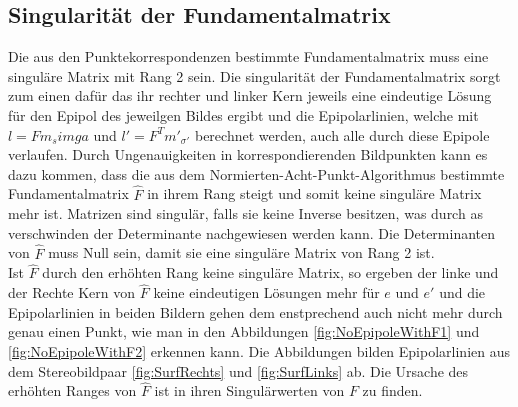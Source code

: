 \subsection{Singularität der Fundamentalmatrix}
\label{sec:SingularityOfF}

Die aus den Punktekorrespondenzen bestimmte Fundamentalmatrix muss eine singuläre Matrix mit Rang 2 sein\cite{HZ,ZZGXr,Ferid}. Die singularität der Fundamentalmatrix sorgt zum einen dafür das ihr rechter und linker Kern jeweils eine eindeutige Lösung für den Epipol des jeweilgen Bildes ergibt und die Epipolarlinien, welche mit $l = Fm_simga$ und $l' = F^Tm'_{\sigma'}$ berechnet werden, auch alle durch diese Epipole verlaufen\cite{HZ}. Durch Ungenauigkeiten in korrespondierenden Bildpunkten kann es dazu kommen, dass die aus dem Normierten-Acht-Punkt-Algorithmus bestimmte Fundamentalmatrix $\hat{F}$ in ihrem Rang steigt und somit keine singuläre Matrix mehr ist. Matrizen sind singulär, falls sie keine Inverse besitzen, was durch as verschwinden der Determinante nachgewiesen werden kann\cite{FormelsammlungMatrizen}. Die Determinanten von $\hat{F}$ muss Null sein, damit sie eine singuläre Matrix von Rang 2 ist.\\

Ist $\hat{F}$ durch den erhöhten Rang keine singuläre Matrix, so ergeben der linke und der Rechte Kern von $\hat{F}$ keine eindeutigen Lösungen mehr für $e$ und $e'$ und die Epipolarlinien in beiden Bildern gehen dem enstprechend auch nicht mehr durch genau einen Punkt, wie man in den Abbildungen \ref{fig:NoEpipoleWithF1} und \ref{fig:NoEpipoleWithF2} erkennen kann. Die Abbildungen bilden Epipolarlinien aus dem Stereobildpaar \ref{fig:SurfRechts} und \ref{fig:SurfLinks} ab. Die Ursache des erhöhten Ranges von $\hat{F}$ ist in ihren Singulärwerten von $F$ zu finden.\\

\pagebreak
%
%
%

